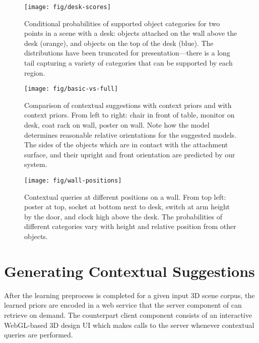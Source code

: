 \documentclass{sigchi}
\begin{document}
\begin{figure}
  \texttt{[image: fig/desk-scores]}
  \caption{Conditional probabilities of supported object categories for two points in a scene with a desk: objects attached on the wall above the desk (orange), and objects on the top of the desk (blue).  The distributions have been truncated for presentation---there is a long tail capturing a variety of categories that can be supported by each region.}
  \label{fig:desk-scores}
\end{figure}

\begin{figure*}
  \centering
  \vspace{-2em}
  \texttt{[image: fig/basic-vs-full]}
  \caption{Comparison of contextual suggestions with \basic context priors and with \full context priors.  From left to right: chair in front of table, monitor on desk, coat rack on wall, poster on wall.  Note how the \full model determines reasonable relative orientations for the suggested models.  The sides of the objects which are in contact with the attachment surface, and their upright and front orientation are predicted by our system.}
  \label{fig:basic-vs-full}
\end{figure*}

\begin{figure}
  \texttt{[image: fig/wall-positions]}
  \caption{Contextual queries at different positions on a wall.  From top left: poster at top, socket at bottom next to desk, switch at arm height by the door, and clock high above the desk.  The probabilities of different categories vary with height and relative position from other objects.}
  \label{fig:wall-positions}
  \vspace{-2em}
\end{figure}


\section{Generating Contextual Suggestions}

After the learning preprocess is completed for a given input 3D scene corpus, the learned priors are encoded in a web service that the server component of \SceneSuggest can retrieve on demand.  The counterpart client component consists of an interactive WebGL-based 3D design UI which makes calls to the server whenever contextual queries are performed.  %
\end{document}
